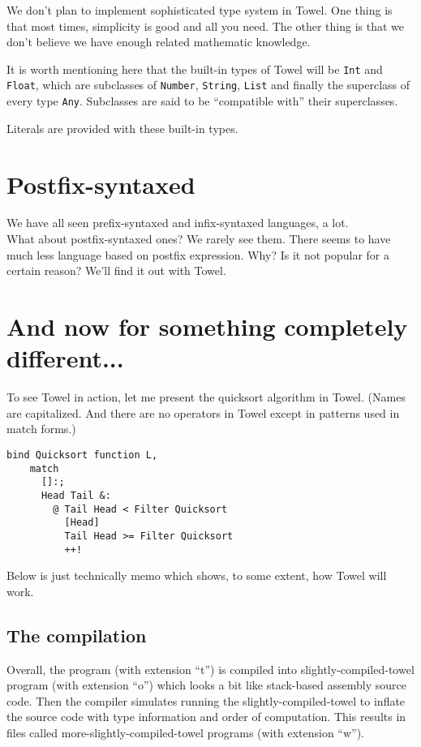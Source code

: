 \documentclass{article}
\begin{document}
We don't plan to implement sophisticated type system in Towel. One thing is that most times, simplicity is good and all you need. The other thing is that we don't believe we have enough related mathematic knowledge.

It is worth mentioning here that the built-in types of Towel will be \texttt{Int} and \texttt{Float}, which are subclasses of \texttt{Number},
\texttt{String}, \texttt{List} and finally the superclass of every type \texttt{Any}. Subclasses are said to be ``compatible with'' their superclasses.

Literals are provided with these built-in types.

\section{Postfix-syntaxed}

We have all seen prefix-syntaxed and infix-syntaxed languages, a lot.\\

What about postfix-syntaxed ones? We rarely see them. There seems to have much less language based on postfix expression. Why? Is it not popular for a certain reason? We'll find it out with Towel.

\section{And now for something completely different...}

To see Towel in action, let me present the quicksort algorithm in Towel. (Names are capitalized. And there are no operators in Towel except in patterns used in match forms.)

\begin{Verbatim}[samepage=true]
  bind Quicksort function L,
    match
      []:;
      Head Tail &:
        @ Tail Head < Filter Quicksort
          [Head]
          Tail Head >= Filter Quicksort
          ++!
\end{Verbatim}

Below is just technically memo which shows, to some extent, how Towel will work.

\subsection{The compilation}

Overall, the program (with extension ``t'') is compiled into slightly-compiled-towel program (with extension ``o'') which looks a bit like stack-based assembly source code. Then the compiler simulates running the slightly-compiled-towel to inflate the source code with type information and order of computation. This results in files called more-slightly-compiled-towel programs (with extension ``w'').\\
\end{document}

